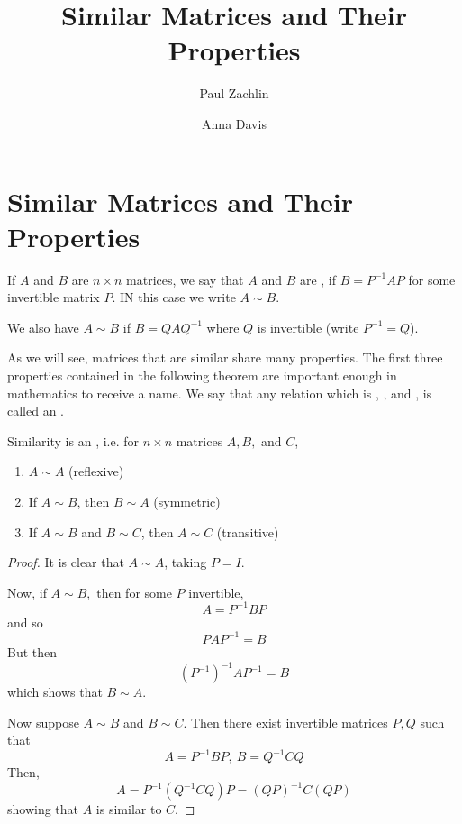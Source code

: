 \documentclass{ximera}
\author{Paul Zachlin \and Anna Davis} \title{Similar Matrices and Their Properties} \license{CC-BY 4.0}
\begin{document}
\begin{abstract}
\end{abstract}
\maketitle

\section*{Similar Matrices and Their Properties}

\begin{definition}
If $A$ and $B$ are $n \times n$ matrices, we say that $A$ and $B$ are , if $B = P^{-1}AP$ for some invertible matrix $P$.  IN this case we write $A \sim B$.
\end{definition}

\begin{remark} 
We also have $A \sim B$ if  $B = QAQ^{-1}$ where $Q$ is invertible (write $P^{-1} = Q$).
\end{remark}

As we will see, matrices that are similar share many properties.  The first three properties contained in the following theorem are important enough in mathematics to receive a name.  We say that any relation which is , , and , is called an .

\begin{theorem}\label{th:{similarityequivalence}}
Similarity is an , i.e. for $n \times n$ matrices $A,B,$ and $C$,
\begin{enumerate}
\item $A \sim A$ (reflexive)
\item If $A \sim B$, then $B \sim A$ (symmetric)
\item If $A \sim B$ and $B \sim C$, then $A \sim C$ (transitive)
\end{enumerate}
\end{theorem}

\begin{proof}
It is clear that $A\sim A$, taking $P=I$.

Now, if $A\sim B,$ then for some $P$ invertible,
\begin{equation*}
A=P^{-1}BP
\end{equation*}
and so
\begin{equation*}
PAP^{-1}=B
\end{equation*}
But then
\begin{equation*}
\left( P^{-1}\right) ^{-1}AP^{-1}=B
\end{equation*}
which shows that $B\sim A$.

Now suppose $A\sim B$ and $B\sim C$. Then there exist invertible matrices
$P,Q$ such that
\begin{equation*}
A=P^{-1}BP,\ B=Q^{-1}CQ
\end{equation*}
Then,
\begin{equation*}
A=P^{-1} \left( Q^{-1}CQ \right)P=\left( QP\right) ^{-1}C\left( QP\right)
\end{equation*}
showing that $A$ is similar to $C$.
\end{proof}
\end{document}
